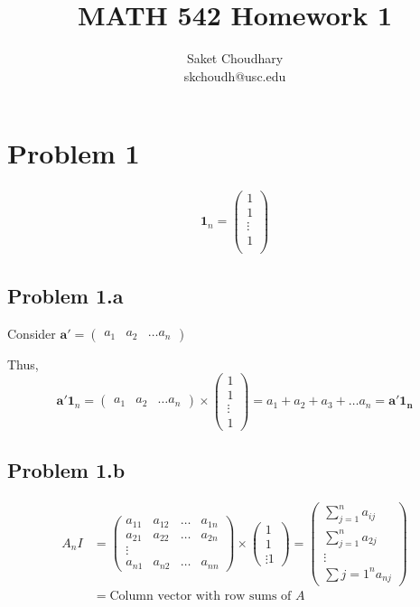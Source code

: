 \documentclass[a4paper]{article}
\title{MATH 542 Homework 1}
\author{Saket Choudhary\\skchoudh@usc.edu}
\begin{document}
\maketitle 
\section*{Problem 1}
\begin{align*}
\mathbf{1}_n = \begin{pmatrix} 1\\
1\\
\vdots\\
1\\
\end{pmatrix}
\end{align*}
\subsection*{Problem 1.a}
Consider $\mathbf{a}' = \begin{pmatrix}a_1 & a_2 & \dots a_n \end{pmatrix}$

Thus, $$\mathbf{a}'\mathbf{1}_n = \begin{pmatrix}a_1 & a_2 & \dots a_n \end{pmatrix} \times \begin{pmatrix} 1\\
1\\
\vdots\\
1\end{pmatrix} = a_1 + a_2 + a_3 + \dots a_n = \mathbf{a'} \mathbf{1_n}
$$
\subsection*{Problem 1.b}
\begin{align*}
A_n I &=  \begin{pmatrix} a_{11} & a_{12} & \dots & a_{1n} \\
a_{21} & a_{22}  & \dots & a_{2n}\\
\vdots\\
a_{n1} & a_{n2} & \dots  & a_{nn}
\end{pmatrix}  \times \begin{pmatrix} 1 \\
1\\
\vdots
1
\end{pmatrix} = \begin{pmatrix} \sum_{j=1}^n a_{ij}\\
\sum_{j=1}^n a_{2j}\\
\vdots\\
\sum{j=1}^n a_{nj}
\end{pmatrix}\\
&= \text{Column vector with row sums of }A
\end{align*}
\end{document}
